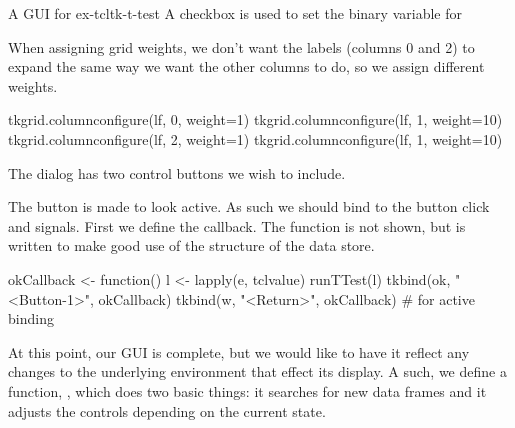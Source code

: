 \begin{example}{A GUI for }{ex-tcltk-t-test}
A checkbox is used to set the binary variable for 
\begin{Schunk}
\end{Schunk}

When assigning grid weights, we don't want the labels (columns 0 and 2) to expand the same way we want the other columns to do, so we assign different weights.
\begin{Schunk}
\begin{Sinput}
 tkgrid.columnconfigure(lf, 0, weight=1)
 tkgrid.columnconfigure(lf, 1, weight=10)
 tkgrid.columnconfigure(lf, 2, weight=1)
 tkgrid.columnconfigure(lf, 1, weight=10)
\end{Sinput}
\end{Schunk}

The dialog has two control buttons we wish to include.
\begin{Schunk}
\end{Schunk}

The  button is made to look active. As such we should bind to the button click and  signals. First we define the callback. The  function is not shown, but is written to make good use of the structure of the data store.
\begin{Schunk}
\begin{Sinput}
 okCallback <- function() {
   l <- lapply(e, tclvalue)
   runTTest(l)
 }
 tkbind(ok, "<Button-1>", okCallback)
 tkbind(w, "<Return>", okCallback)        # for active binding
\end{Sinput}
\end{Schunk}

At this point, our GUI is complete, but we would like to have it
reflect any changes to the underlying \R\/ environment that effect its
display. A such, we define
a function, , which does two basic things: it searches for
new data frames and it adjusts the controls depending on the current
state.
\begin{Schunk}
\end{Schunk}
\end{example}
